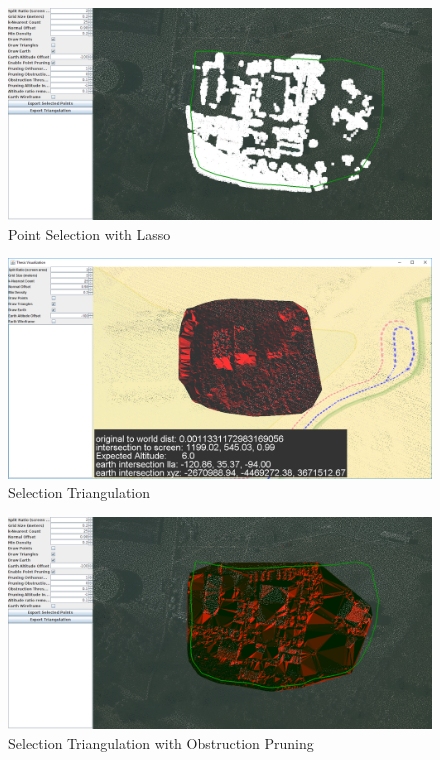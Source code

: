 \begin{figure}[htp]
\begin{center}
  \includegraphics[width=6.0in]{images/pointSelection2.png}
  \caption{Point Selection with Lasso}
  \label{fig:pointSelection2}
\end{center}
\end{figure}

\begin{figure}[htp]
\begin{center}
  \includegraphics[width=6.0in]{images/triangulation2.png}
  \caption{Selection Triangulation}
  \label{fig:triangulation2}
\end{center}
\end{figure}

\begin{figure}[htp]
\begin{center}
  \includegraphics[width=6.0in]{images/triangulation3.png}
  \caption{Selection Triangulation with Obstruction Pruning}
  \label{fig:triangulation3}
\end{center}
\end{figure}

